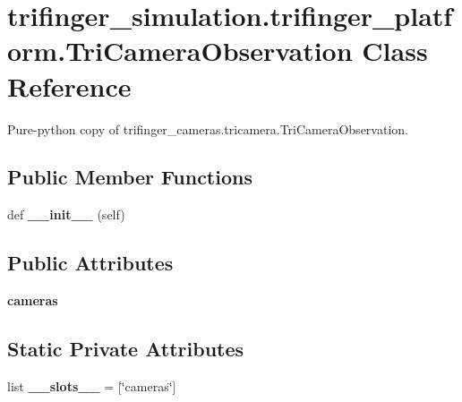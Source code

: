 \hypertarget{classtrifinger__simulation_1_1trifinger__platform_1_1TriCameraObservation}{}\section{trifinger\+\_\+simulation.\+trifinger\+\_\+platform.\+Tri\+Camera\+Observation Class Reference}
\label{classtrifinger__simulation_1_1trifinger__platform_1_1TriCameraObservation}


Pure-\/python copy of trifinger\+\_\+cameras.\+tricamera.\+Tri\+Camera\+Observation.  


\subsection*{Public Member Functions}
\begin{DoxyCompactItemize}
\item 
\mbox{\label{classtrifinger__simulation_1_1trifinger__platform_1_1TriCameraObservation_ab4dabbece119b22a5c939496a4e3e32e}} 
def {\bfseries \+\_\+\+\_\+init\+\_\+\+\_\+} (self)
\end{DoxyCompactItemize}
\subsection*{Public Attributes}
\begin{DoxyCompactItemize}
\item 
\mbox{\label{classtrifinger__simulation_1_1trifinger__platform_1_1TriCameraObservation_a9e2b5fe60329e4affb7756934dd30b67}} 
{\bfseries cameras}
\end{DoxyCompactItemize}
\subsection*{Static Private Attributes}
\begin{DoxyCompactItemize}
\item 
\mbox{\label{classtrifinger__simulation_1_1trifinger__platform_1_1TriCameraObservation_a6e2ca238101d10184a6945751db055b2}} 
list {\bfseries \+\_\+\+\_\+slots\+\_\+\+\_\+} = \mbox{[}\char`\"{}cameras\char`\"{}\mbox{]}
\end{DoxyCompactItemize}


